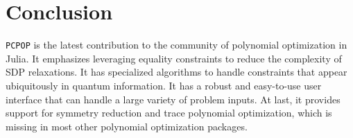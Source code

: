 \section{Conclusion}
\texttt{PCPOP} is the latest contribution to the community of polynomial optimization in Julia. It emphasizes leveraging equality constraints to reduce the complexity of SDP relaxations. It has specialized algorithms to handle constraints that appear ubiquitously in quantum information. It has a robust and easy-to-use user interface that can handle a large variety of problem inputs. At last, it provides support for symmetry reduction and trace polynomial optimization, which is missing in most other polynomial optimization packages. 